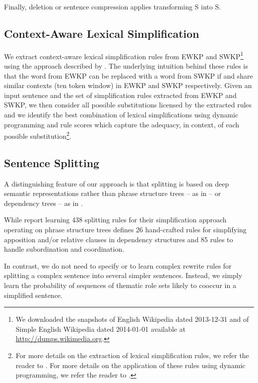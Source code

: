 \documentclass[11pt,a4paper]{article}
\begin{document}
Finally, deletion or sentence compression applies transforming S
into S.

\subsection{Context-Aware Lexical Simplification}
\label{subsec:lexicalsimplification}

We extract context-aware lexical simplification rules from EWKP and
SWKP\footnote{We downloaded the snapshots of English Wikipedia dated
  2013-12-31 and of Simple English Wikipedia dated 2014-01-01
  available at \url{http://dumps.wikimedia.org}.} using the approach
described by . The underlying intuition
behind these rules is that the word  from EWKP can be replaced with
a word  from SWKP if  and  share similar contexts (ten token
window) in EWKP and SWKP respectively. Given an input sentence and the
set of simplification rules extracted from EWKP and SWKP, we then
consider all possible  substitutions licensed by the extracted
rules and we identify the best combination of lexical simplifications
using dynamic programming and rule scores which capture the adequacy,
in context, of each possible substitution\footnote{For more details on
  the extraction of lexical simplification rules, we refer the reader
  to . For more details on the application
  of these rules using dynamic programming, we refer the reader to
  .}.






\subsection{Sentence Splitting}
\label{subsec:sentencesplitting}

A distinguishing feature of our approach is that splitting is
based on deep semantic representations rather than phrase structure
trees -- as in \cite{zhu2010monolingual,woodsend2011learning} -- or
dependency trees -- as in \cite{siddharthan-mandya:2014:EACL}.  

While  report learning 438 splitting
rules for their simplification approach operating on phrase structure
trees  defines 26 hand-crafted
rules for simplifying apposition and/or relative clauses in dependency
structures and 85 rules to handle subordination and coordination.  

In contrast, we do not need to specify or to learn complex rewrite
rules for splitting a complex sentence into several simpler sentences.
Instead, we simply learn the probability of sequences of thematic role
sets likely to cooccur in a simplified sentence.
\end{document}
